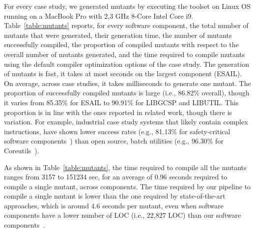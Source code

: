 {For every case study, we generated mutants by executing the \APPR toolset on Linux OS running on a MacBook Pro with 2,3 GHz 8-Core Intel Core i9. 
Table~\ref{table:mutants} reports, for every software component, the total number of mutants that were generated, their generation time, the number of mutants successfully compiled, the proportion of compiled mutants with respect to the overall number of mutants generated, and the time required to compile mutants using the default compiler optimization options of the case study.
The generation of mutants is fast, it takes at most  seconds on the largest component (ESAIL). On average, across case studies, it takes  milliseconds to generate one mutant. 
The proportion of successfully compiled mutants is large (i.e., 86.82\% overall), though it varies from 85.35\% for ESAIL to 90.91\% for LIBGCSP and LIBUTIL.
This proportion is in line with the ones reported in related work, though there is variation. For example, industrial case study systems that likely contain complex instructions, have shown lower success rates (e.g., 81.13\% for safety-critical software components~\cite{Baker2013}) than open source, batch utilities (e.g., 96.30\% for Coreutils~\cite{hariri2016evaluating}).}
 
{As shown in Table~\ref{table:mutants}, the time required to compile all the mutants ranges from 3157 to 151234 sec, for an average of 0.96 seconds required to compile a single mutant, across components. The time required by our pipeline to compile a single mutant is lower than the one required by state-of-the-art approaches, which is around 4.6 seconds per mutant, even when software components have a lower number of LOC (i.e., 22,827 LOC)  than our software components~\cite{kintis2017detecting}.
}

 



%



